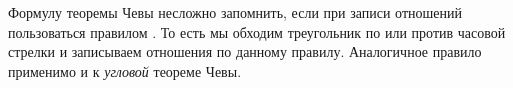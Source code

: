 \documentclass[14pt]{extarticle}
\theoremstyle{definition}
\theoremstyle{theorem}
\newtheorem*{remark}{\textup{Комментарий}}
\renewenvironment{remark}
    {\noindent\textbf{Комментарий.}}
\newenvironment{note}
    {\noindent {\normalfont\fontsize{14}{14}\textbf{\textit{Примечание.}}}}
\begin{document}

\begin{note}
Формулу теоремы Чевы несложно запомнить, если при записи отношений
пользоваться правилом .%
То есть мы обходим треугольник по или против часовой стрелки и записываем
отношения по данному правилу. Аналогичное правило применимо и к \textit{угловой}
теореме Чевы.\\
\end{note}
\end{document}
